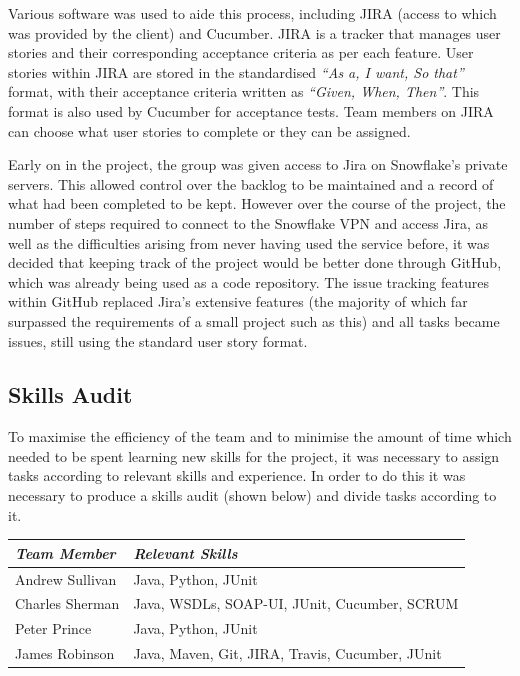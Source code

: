\documentclass[a4paper, 12pt, twoside]{article}
\begin{document}
Various software was used to aide this process, including JIRA (access to which was provided by the client) and Cucumber. JIRA is a tracker that manages user stories and their corresponding acceptance criteria as per each feature. User stories within JIRA are stored in the standardised \emph{``As a, I want, So that''} format, with their acceptance criteria written as \emph{``Given, When, Then''}. This format is also used by Cucumber for acceptance tests. Team members on JIRA can choose what user stories to complete or they can be assigned.

Early on in the project, the group was given access to Jira on Snowflake's private servers. This allowed control over the backlog to be maintained and a record of what had been completed to be kept. However over the course of the project, the number of steps required to connect to the Snowflake VPN and access Jira, as well as the difficulties arising from never having used the service before, it was decided that keeping track of the project would be better done through GitHub, which was already being used as a code repository. The issue tracking features within GitHub replaced Jira's extensive features (the majority of which far surpassed the requirements of a small project such as this) and all tasks became issues, still using the standard user story format.

\subsection{Skills Audit}
\label{sec:plan_skills_audit}
To maximise the efficiency of the team and to minimise the amount of time which needed to be spent learning new skills for the project, it was necessary to assign tasks according to relevant skills and experience. In order to do this it was necessary to produce a skills audit (shown below) and divide tasks according to it.

\begin{table}[h]
\begin{tabular}{|l|l|}
\hline
\emph{Team Member} & \emph{Relevant Skills}                           \\ \hline
Andrew Sullivan    & Java, Python, JUnit                              \\ \hline
Charles Sherman    & Java, WSDLs, SOAP-UI, JUnit, Cucumber, SCRUM     \\ \hline
Peter Prince       & Java, Python, JUnit                              \\ \hline
James Robinson     & Java, Maven, Git, JIRA, Travis, Cucumber, JUnit  \\ \hline
\end{tabular}
\end{table}
\end{document}
